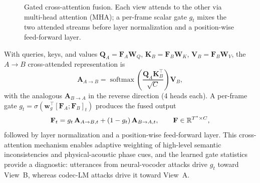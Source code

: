 \begin{figure}[t]
\centering
{}
\caption{Gated cross-attention fusion. Each view attends to the other via multi-head
attention (MHA); a per-frame scalar gate $g_t$ mixes the two attended streams before
layer normalization and a position-wise feed-forward layer.}
\label{fig:fusion}
\end{figure}

With queries, keys, and values $\mathbf{Q}_A = \mathbf{F}_A \mathbf{W}_Q$,
$\mathbf{K}_B = \mathbf{F}_B \mathbf{W}_K$, $\mathbf{V}_B = \mathbf{F}_B \mathbf{W}_V$,
the $A{\to}B$ cross-attended representation is
\begin{equation}
\mathbf{A}_{A \rightarrow B} = \operatorname{softmax}\!\left(
    \frac{\mathbf{Q}_A \mathbf{K}_B^\top}{\sqrt{C}}\right) \mathbf{V}_B ,
\end{equation}
with the analogous $\mathbf{A}_{B \rightarrow A}$ in the reverse direction (4 heads
each). A per-frame gate
$g_t = \sigma(\mathbf{w}_g^\top [\mathbf{F}_A; \mathbf{F}_B]_t)$ produces the fused
output
\begin{equation}
\mathbf{F}_t = g_t \, \mathbf{A}_{A \rightarrow B, t} + (1 - g_t)\,
\mathbf{A}_{B \rightarrow A, t}, \qquad \mathbf{F} \in \mathbb{R}^{T^* \times C},
\end{equation}
followed by layer normalization and a position-wise feed-forward layer. This cross-attention mechanism enables adaptive weighting of high-level semantic inconsistencies and physical-acoustic phase cues, and
the learned gate statistics provide a diagnostic: utterances from neural-vocoder
attacks drive $g_t$ toward View~B, whereas codec-LM attacks drive it toward View~A.

